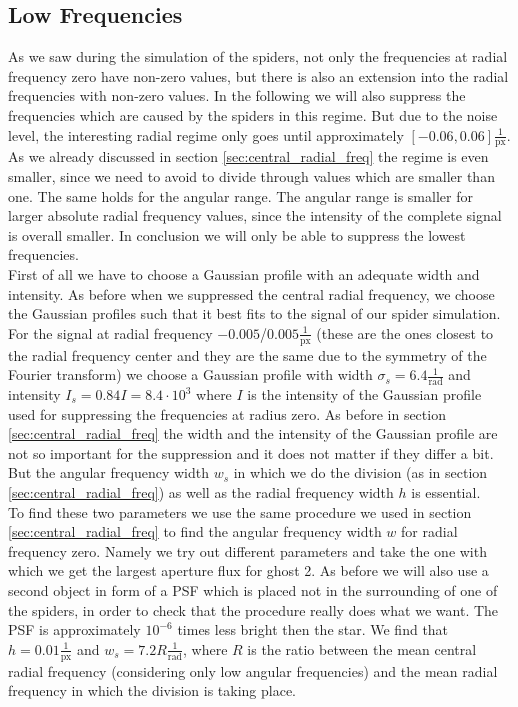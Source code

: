 \subsection{Low Frequencies}
As we saw during the simulation of the spiders, not only the frequencies at radial frequency zero have non-zero values, but there is also an extension into the radial frequencies with non-zero values. In the following we will also suppress the frequencies which are caused by the spiders in this regime. But due to the noise level, the interesting radial regime only goes until approximately $[-0.06, 0.06] \frac{1}{\mathrm{px}}$. As we already discussed in section \ref{sec:central_radial_freq} the regime is even smaller, since we need to avoid to divide through values which are smaller than one. The same holds for the angular range. The angular range is smaller for larger absolute radial frequency values, since the intensity of the complete signal is overall smaller. In conclusion we will only be able to suppress the lowest frequencies.\\
First of all we have to choose a Gaussian profile with an adequate width and intensity. As before when we suppressed the central radial frequency, we choose the Gaussian profiles such that it best fits to the signal of our spider simulation. For the signal at radial frequency $-0.005$/$0.005 \frac{1}{\mathrm{px}}$ (these are the ones closest to the radial frequency center and they are the same due to the symmetry of the Fourier transform) we choose a Gaussian profile with width $\sigma_s = 6.4 \frac{1}{\mathrm{rad}}$ and intensity $I_s = 0.84 I = 8.4 \cdot 10^3$ where $I$ is the intensity of the Gaussian profile used for suppressing the frequencies at radius zero. As before in section \ref{sec:central_radial_freq} the width and the intensity of the Gaussian profile are not so important for the suppression and it does not matter if they differ a bit. But the angular frequency width $w_s$ in which we do the division (as in section \ref{sec:central_radial_freq}) as well as the radial frequency width $h$ is essential.\\
To find these two parameters we use the same procedure we used in section \ref{sec:central_radial_freq} to find the angular frequency width $w$ for radial frequency zero. Namely we try out different parameters and take the one with which we get the largest aperture flux for ghost 2. As before we will also use a second object in form of a PSF which is placed not in the surrounding of one of the spiders, in order to check that the procedure really does what we want. The PSF is approximately $10^{-6}$ times less bright then the star. We find that $h = 0.01 \frac{1}{\mathrm{px}}$ and $w_s = 7.2 R \frac{1}{\mathrm{rad}}$, where $R$ is the ratio between the mean central radial frequency (considering only low angular frequencies) and the mean radial frequency in which the division is taking place.\\
